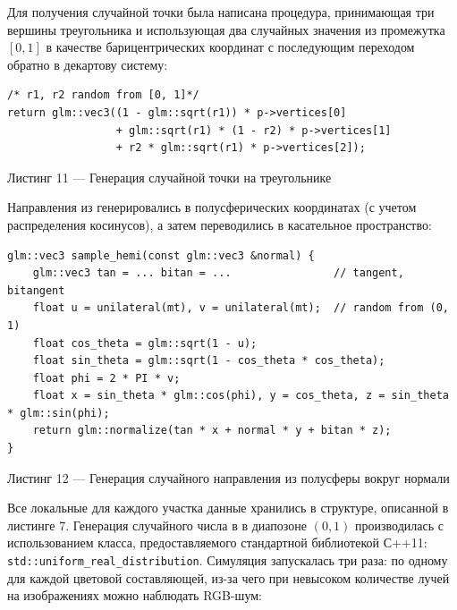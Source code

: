 \documentclass[12pt]{article}
\begin{document}
Для получения случайной точки была написана процедура, принимающая три вершины треугольника и использующая два случайных значения из промежутка $[0, 1]$ в качестве барицентрических координат с последующим переходом обратно в декартову систему:
\begin{lstlisting}
/* r1, r2 random from [0, 1]*/
return glm::vec3((1 - glm::sqrt(r1)) * p->vertices[0] 
                 + glm::sqrt(r1) * (1 - r2) * p->vertices[1] 
                 + r2 * glm::sqrt(r1) * p->vertices[2]);
\end{lstlisting}
\begin{center}Листинг 11 --- Генерация случайной точки на треугольнике \end{center}

Направления из генерировались в полусферических координатах (с учетом распределения косинусов), а затем переводились в касательное пространство:
\begin{lstlisting}
glm::vec3 sample_hemi(const glm::vec3 &normal) {
    glm::vec3 tan = ... bitan = ...                // tangent, bitangent               
    float u = unilateral(mt), v = unilateral(mt);  // random from (0, 1)
    float cos_theta = glm::sqrt(1 - u);
    float sin_theta = glm::sqrt(1 - cos_theta * cos_theta);
    float phi = 2 * PI * v;
    float x = sin_theta * glm::cos(phi), y = cos_theta, z = sin_theta * glm::sin(phi);
    return glm::normalize(tan * x + normal * y + bitan * z);
}
\end{lstlisting}
\begin{center}Листинг 12 --- Генерация случайного направления из полусферы вокруг нормали \end{center}

Все локальные для каждого участка данные хранились в структуре, описанной в листинге 7. Генерация случайного числа в в диапозоне $(0, 1)$ производилась с использованием класса, предоставляемого стандартной библиотекой С++11: \texttt{std::uniform\_real\_distribution}. Симуляция запускалась три раза: по одному для каждой цветовой составляющей, из-за чего при невысоком количестве лучей на изображениях можно наблюдать RGB-шум:
\end{document}
